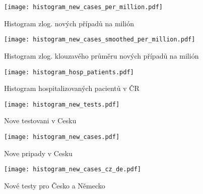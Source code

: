 \documentclass[a4paper, 12pt]{article}
\begin{document}
\begin{figure}[H]
\centering
\texttt{[image: histogram\_new\_cases\_per\_million.pdf]}
\caption{Histogram zlog. nových případů na milión}

\end{figure}
\begin{figure}[H]
\centering

\texttt{[image: histogram\_new\_cases\_smoothed\_per\_million.pdf]}
\caption{Histogram zlog. klouzavého průměru nových případů na milión}

\texttt{[image: histogram\_hosp\_patients.pdf]}
\caption{Histogram hospitalizovaných pacientů v ČR}

\end{figure}
\begin{figure}[H]
\centering

\texttt{[image: histogram\_new\_tests.pdf]}
\caption{Nove testovani v Cesku}

\texttt{[image: histogram\_new\_cases.pdf]}
\caption{Nove pripady v Cesku}

\end{figure}
\begin{figure}[H]
\centering

\texttt{[image: histogram\_new\_cases\_cz\_de.pdf]}
\caption{Nové testy pro Česko a Německo}

\end{figure}
\end{document}
